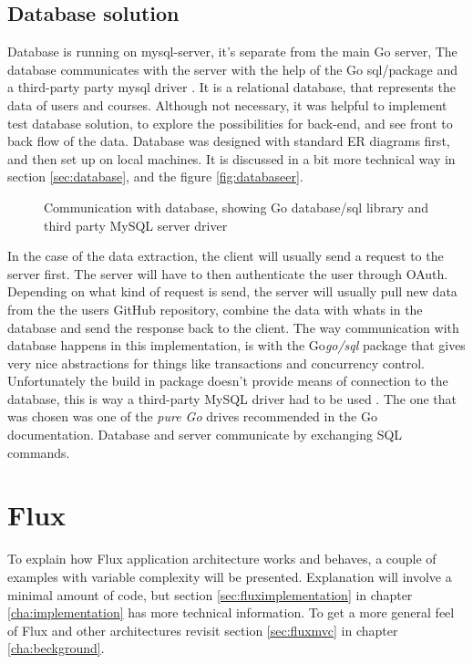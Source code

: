 \subsection{Database solution}
Database is running on mysql-server, it's separate from the main Go server, The database communicates with the server with the help of the Go sql/package and a third-party party mysql driver \cite{ziutek}. It is a relational database, that represents the data of users and courses. Although not necessary, it was helpful to implement test database solution, to explore the possibilities for back-end, and see front to back flow of the data. Database was designed with standard ER diagrams first, and then set up on local machines.
It is discussed in a bit more technical way in section \ref{sec:database}, and the figure \ref{fig:databaseer}.
\begin{figure}[h]
  \scalebox{1}{}
  \caption{Communication with database, showing Go database/sql library and third party MySQL server driver \cite{ziutekdriver}}
  \label{fig:databaseoverview}
\end{figure}

In the case of the data extraction, the client will usually send a request to the server first. The server will have to then authenticate the user through OAuth. Depending on what kind of request is send, the server will usually pull new data from the the users GitHub repository, combine the data with whats in the database and send the response back to the client. The way communication with database happens in this implementation, is with the Go\emph{go/sql} package that gives very nice abstractions for things like transactions and concurrency control. Unfortunately the build in package doesn't provide means of connection to the database, this is way a third-party MySQL driver had to be used \cite{ziutek}. The one that was chosen was one of the \emph{pure Go} drives recommended in the Go documentation. Database and server communicate by exchanging SQL commands.
\section{Flux}\label{sec:designflux}
To explain how Flux application architecture works and behaves, a couple of examples with variable complexity will be presented. Explanation will involve a minimal amount of code, but section \ref{sec:fluximplementation} in chapter \ref{cha:implementation} has more technical information. To get a more general feel of Flux and other architectures revisit section \ref{sec:fluxmvc} in chapter \ref{cha:beckground}.


